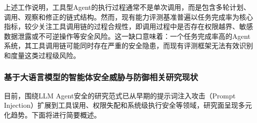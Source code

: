 上述工作说明，工具型Agent的执行过程通常不是单次调用，而是包含多轮计划、调用、观察和修正的链式结构。然而，现有能力评测基准普遍以任务完成率为核心指标，较少关注工具调用链的过程合规性，即调用过程中是否存在权限越界、敏感数据泄露或不可逆操作等安全风险。这一缺口意味着：一个任务完成率高的Agent系统，其工具调用链可能同时存在严重的安全隐患，而现有评测框架无法有效识别和度量这类过程级风险。

\subsubsection{基于大语言模型的智能体安全威胁与防御相关研究现状}

目前，围绕LLM Agent安全的研究范式已从早期的提示词注入攻击（Prompt Injection）扩展到工具误用、权限失配和系统级执行安全等领域，研究面呈现多元化趋势。下面将进行简要概述。

